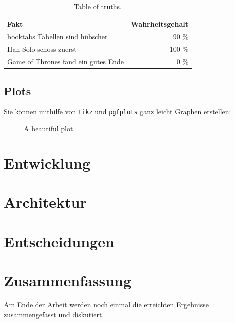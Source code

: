\begin{table}[ht]
  \begin{center}
    \begin{tabular}{lr}
      \toprule
      Fakt                                & Wahrheitsgehalt \\
      \midrule
      booktabs Tabellen sind hübscher     & 90 \%           \\
      Han Solo schoss zuerst              & 100 \%          \\
      Game of Thrones fand ein gutes Ende & 0 \%            \\
      \bottomrule
    \end{tabular}
    \caption{Table of truths.}%
    \label{table:truths}
  \end{center}
\end{table}

\subsection{Plots}%
\label{sec:plot}

Sie können mithilfe von \texttt{tikz} und \texttt{pgfplots}
ganz leicht Graphen erstellen:

\begin{figure}[ht]
  \centering
  \caption{A beautiful plot.}%
  \label{fig:the-plot}
\end{figure}

\section{Entwicklung}


\section{Architektur}


\section{Entscheidungen}


\section{Zusammenfassung}

Am Ende der Arbeit werden noch einmal die erreichten Ergebnisse
zusammengefasst und diskutiert.
